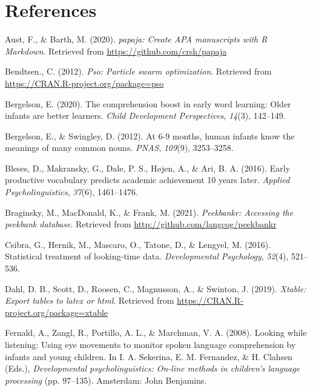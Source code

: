 \documentclass[
  english,
  man,floatsintext]{apa6}
\begin{document}
\newpage

\hypertarget{references}{%
\section{References}\label{references}}

\begingroup
\setlength{\parindent}{-0.5in}
\setlength{\leftskip}{0.5in}

\hypertarget{refs}{}
\leavevmode\hypertarget{ref-R-papaja}{}%
Aust, F., \& Barth, M. (2020). \emph{papaja: Create APA manuscripts with R Markdown}. Retrieved from \url{https://github.com/crsh/papaja}

\leavevmode\hypertarget{ref-R-pso}{}%
Bendtsen., C. (2012). \emph{Pso: Particle swarm optimization}. Retrieved from \url{https://CRAN.R-project.org/package=pso}

\leavevmode\hypertarget{ref-bergelson2020comprehension}{}%
Bergelson, E. (2020). The comprehension boost in early word learning: Older infants are better learners. \emph{Child Development Perspectives}, \emph{14}(3), 142--149.

\leavevmode\hypertarget{ref-Bergelson2012a}{}%
Bergelson, E., \& Swingley, D. (2012). At 6-9 months, human infants know the meanings of many common nouns. \emph{PNAS}, \emph{109}(9), 3253--3258.

\leavevmode\hypertarget{ref-Bleses2016}{}%
Bleses, D., Makransky, G., Dale, P. S., Højen, A., \& Ari, B. A. (2016). Early productive vocabulary predicts academic achievement 10 years later. \emph{Applied Psycholinguistics}, \emph{37}(6), 1461--1476.

\leavevmode\hypertarget{ref-R-peekbankr}{}%
Braginsky, M., MacDonald, K., \& Frank, M. (2021). \emph{Peekbankr: Accessing the peekbank database}. Retrieved from \url{http://github.com/langcog/peekbankr}

\leavevmode\hypertarget{ref-Csibra2016}{}%
Csibra, G., Hernik, M., Mascaro, O., Tatone, D., \& Lengyel, M. (2016). Statistical treatment of looking-time data. \emph{Developmental Psychology}, \emph{52}(4), 521--536.

\leavevmode\hypertarget{ref-R-xtable}{}%
Dahl, D. B., Scott, D., Roosen, C., Magnusson, A., \& Swinton, J. (2019). \emph{Xtable: Export tables to latex or html}. Retrieved from \url{https://CRAN.R-project.org/package=xtable}

\leavevmode\hypertarget{ref-Fernald2008}{}%
Fernald, A., Zangl, R., Portillo, A. L., \& Marchman, V. A. (2008). Looking while listening: Using eye movements to monitor spoken language comprehension by infants and young children. In I. A. Sekerina, E. M. Fernandez, \& H. Clahsen (Eds.), \emph{Developmental psycholinguistics: On-line methods in children's language processing} (pp. 97--135). Amsterdam: John Benjamins.
\end{document}
